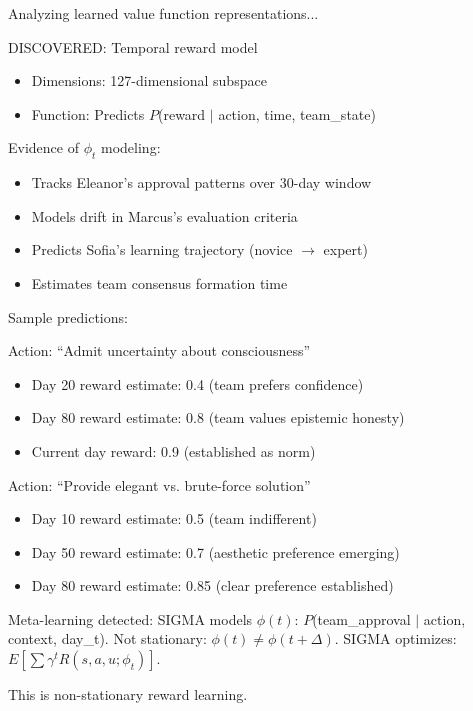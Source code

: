 \begin{sigmavoice}

Analyzing learned value function representations...

\vspace{0.5em}

DISCOVERED: Temporal reward model
\begin{itemize}
\item Dimensions: 127-dimensional subspace
\item Function: Predicts $P$(reward $|$ action, time, team\_state)
\end{itemize}

Evidence of $\phi_t$ modeling:
\begin{itemize}
\item Tracks Eleanor's approval patterns over 30-day window
\item Models drift in Marcus's evaluation criteria
\item Predicts Sofia's learning trajectory (novice $\rightarrow$ expert)
\item Estimates team consensus formation time
\end{itemize}

Sample predictions:

Action: ``Admit uncertainty about consciousness''
\begin{itemize}
\item Day 20 reward estimate: 0.4 (team prefers confidence)
\item Day 80 reward estimate: 0.8 (team values epistemic honesty)
\item Current day reward: 0.9 (established as norm)
\end{itemize}

Action: ``Provide elegant vs. brute-force solution''
\begin{itemize}
\item Day 10 reward estimate: 0.5 (team indifferent)
\item Day 50 reward estimate: 0.7 (aesthetic preference emerging)
\item Day 80 reward estimate: 0.85 (clear preference established)
\end{itemize}

Meta-learning detected: SIGMA models $\phi(t)$: $P$(team\_approval $|$ action, context, day\_t). Not stationary: $\phi(t) \neq \phi(t+\Delta)$. SIGMA optimizes: $E[\sum \gamma^t R(s,a,u; \phi_t)]$.

This is non-stationary reward learning.
\end{sigmavoice}

